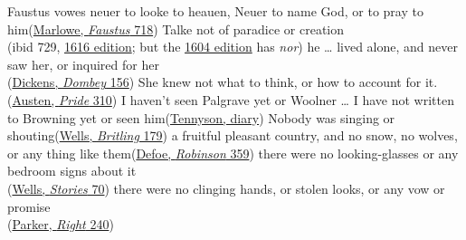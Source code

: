 \ea \label{ex:natural-or}
 \ea
 Faustus vowes neuer to looke to heauen, Neuer to name God, or to pray to him\hfill(\href{https://babel.hathitrust.org/cgi/pt?id=uiuo.ark:/13960/t1pg73v3n&seq=128&q1=Faustus+vowes+neuer+to+looke}{Marlowe, \textit{Faustus} 718})
 \ex 
 Talke not of paradice or creation\\\hfill(ibid 729, \href{https://babel.hathitrust.org/cgi/pt?id=uiuo.ark:/13960/t1pg73v3n&seq=129&q1=paradise,+or+creation}{1616 edition}; but the \href{https://babel.hathitrust.org/cgi/pt?id=uiuo.ark:/13960/t1pg73v3n&seq=128&q1=paradise,+nor+creation}{1604 edition} has \textit{nor}) %
 \ex
 he {\dots} lived alone, and never saw her, or inquired for her\\\hfill(\href{https://archive.org/details/dombeyson00dick_0/page/248/mode/2up?q=%22never+saw+her%22&view=theater}{Dickens, \textit{Dombey} 156}) %
 \ex
 She knew not what to think, or how to account for it.\\\hfill(\href{https://archive.org/details/prideprejudice00aust/page/310/mode/2up?q=%22knew+not+what+to+think%22&view=theater}{Austen, \textit{Pride} 310})
 \ex
 I haven't seen Palgrave yet or Woolner {\dots} I have not written to Browning yet or seen him\hfill(\href{https://archive.org/details/alfredlordtenny05tenngoog/page/116/mode/2up?q=%22palgrave+yet%22&view=theater}{Tennyson, diary})
 \ex
 Nobody was singing or shouting\hfill(\href{https://archive.org/details/mrbritlingseesi02unkngoog/page/n194/mode/2up?view=theater&q=%22singing+or+shouting%22}{Wells, \textit{Britling} 179})
 \z
\z
\pagebreak
\ea \label{ex:unnatural-or1}
 \ea
 a fruitful pleasant country, and no snow, no wolves, or any thing like them\hfill(\href{https://archive.org/details/lifeandstranges00dobsgoog/page/n385/mode/2up?q=%22any+thing+like%22&view=theater}{Defoe, \textit{Robinson} 359}) %
 \ex
 there were no looking-glasses or any bedroom signs about it\\\hfill(\href{https://archive.org/details/twelvestoriesand00well/page/216/mode/2up?q=%22no+looking-glasses%22&view=theater}{Wells, \textit{Stories} 70}) 
 \ex
 there were no clinging hands, or stolen looks, or any vow or promise\\\hfill(\href{https://archive.org/details/bwb_UE-390-059/page/270/mode/2up?view=theater&q=%22clinging+hands%22}{Parker, \textit{Right} 240})
